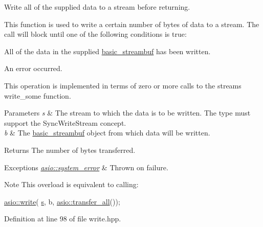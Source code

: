 Write all of the supplied data to a stream before returning. 

This function is used to write a certain number of bytes of data to a stream. The call will block until one of the following conditions is true\+:

\begin{DoxyItemize}
\item All of the data in the supplied \hyperlink{classasio_1_1basic__streambuf}{basic\+\_\+streambuf} has been written.\end{DoxyItemize}
\begin{DoxyItemize}
\item An error occurred.\end{DoxyItemize}
This operation is implemented in terms of zero or more calls to the stream\textquotesingle{}s write\+\_\+some function.


\begin{DoxyParams}{Parameters}
{\em s} & The stream to which the data is to be written. The type must support the Sync\+Write\+Stream concept.\\
\hline
{\em b} & The \hyperlink{classasio_1_1basic__streambuf}{basic\+\_\+streambuf} object from which data will be written.\\
\hline
\end{DoxyParams}
\begin{DoxyReturn}{Returns}
The number of bytes transferred.
\end{DoxyReturn}

\begin{DoxyExceptions}{Exceptions}
{\em \hyperlink{classasio_1_1system__error}{asio\+::system\+\_\+error}} & Thrown on failure.\\
\hline
\end{DoxyExceptions}
\begin{DoxyNote}{Note}
This overload is equivalent to calling\+: 
\begin{DoxyCode}
\hyperlink{group__write_gaf53a6638aac728c8bf61621b12fa8fce}{asio::write}(
   \hyperlink{group__async__connect_ga31ab74b9ea6c77932dddd016cfc7920a}{s}, b,
   \hyperlink{group__completion__condition_ga4a82e92df79aa8401a8bc2117d4cf900}{asio::transfer\_all}()); 
\end{DoxyCode}
 
\end{DoxyNote}


Definition at line 98 of file write.\+hpp.

\hypertarget{group__write_gaf72f7eddd7d4629ea2e2b7f5b7f355bc}{}
